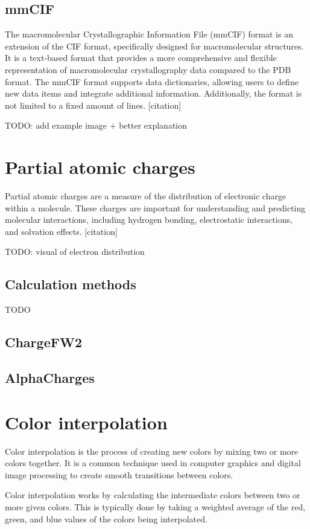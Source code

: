 \documentclass[
  digital,     %
  oneside,     %
  nosansbold,  %
  nocolorbold, %
  lof,         %
  lot,         %
]{fithesis4}
\begin{document}
\subsection{mmCIF}
The macromolecular Crystallographic Information File (mmCIF) format is an extension of the CIF format, specifically designed for macromolecular structures. It is a text-based format that provides a more comprehensive and flexible representation of macromolecular crystallography data compared to the PDB format. The mmCIF format supports data dictionaries, allowing users to define new data items and integrate additional information. Additionally, the format is not limited to a fixed amount of lines. [citation]

TODO: add example image + better explanation

\section{Partial atomic charges}
Partial atomic charges are a measure of the distribution of electronic charge within a molecule. These charges are important for understanding and predicting molecular interactions, including hydrogen bonding, electrostatic interactions, and solvation effects. [citation]

TODO: visual of electron distribution

\subsection{Calculation methods}
TODO

\subsection{ChargeFW2}
\subsection{AlphaCharges}

\section{Color interpolation}
Color interpolation is the process of creating new colors by mixing two or more colors together. It is a common technique used in computer graphics and digital image processing to create smooth transitions between colors.

Color interpolation works by calculating the intermediate colors between two or more given colors. This is typically done by taking a weighted average of the red, green, and blue values of the colors being interpolated.
\end{document}
